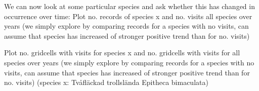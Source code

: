 \documentclass[
  10pt,
]{article}
\begin{document}
We can now look at some particular species and ask whether this has changed in occurrence over time:
Plot no. records of species x and no. visits all species over years (we simply explore by comparing records for a species with no visits, can assume that species has increased of stronger positive trend than for no. visits)

Plot no. gridcells with visits for species x and no. gridcells with visits for all species over years (we simply explore by comparing records for a species with no visits, can assume that species has increased of stronger positive trend than for no. visits)
(species x: Tvåfläckad trollslända Epitheca bimaculata)

  
\end{document}
